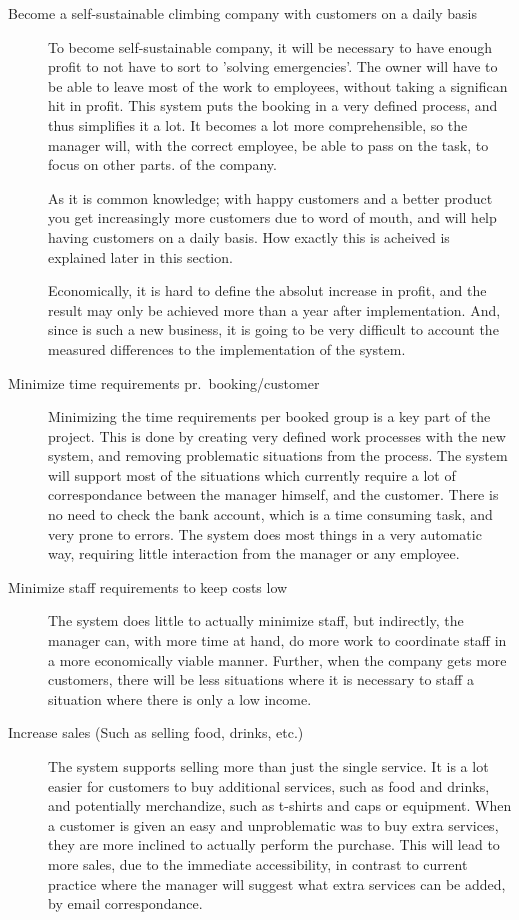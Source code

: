 \begin{description}
\item[Become a self-sustainable climbing company with customers on a daily basis]
To become self-sustainable company, it will be necessary to have enough profit
to not have to sort to 'solving emergencies'. The owner will have to be able 
to leave most of the work to employees, without taking a significan hit in 
profit. This system puts the booking in a very defined process, and thus 
simplifies it a lot. It becomes a lot more comprehensible, so the manager will,
with the correct employee, be able to pass on the task, to focus on other parts.
of the company.

As it is common knowledge; with happy customers and a better product
you get increasingly more customers due to word of mouth, and will help having 
customers on a daily basis. How exactly this is acheived is explained later in this 
section.

Economically, it is hard to define the absolut increase in profit, and the 
result may only be achieved more than a year after implementation. And, since 
\gomonkey{} is such a new business, it is going to be very difficult to account
the measured differences to the implementation of the system.

\item[Minimize time requirements pr.\ booking/customer]
Minimizing the time requirements per booked group is a key part of the project.
This is done by creating very defined work processes with the new system, and
removing problematic situations from the process. The system will support most
of the situations which currently require a lot of correspondance between the 
manager himself, and the customer. There is no need to check the bank account,
which is a time consuming task, and very prone to errors. The system does most
things in a very automatic way, requiring little interaction from the manager
or any employee.

\item[Minimize staff requirements to keep costs low]
The system does little to actually minimize staff, but indirectly, the manager
can, with more time at hand, do more work to coordinate staff in a more 
economically viable manner. Further, when the company gets more customers,
there will be less situations where it is necessary to staff a situation where
there is only a low income.

\item[Increase sales (Such as selling food, drinks, etc.)]
The system supports selling more than just the single service. It is a lot
easier for customers to buy additional services, such as food and drinks,
and potentially merchandize, such as t-shirts and caps or equipment. When a 
customer is given an easy and unproblematic was to buy extra services,
they are more inclined to actually perform the purchase. This will lead to
more sales, due to the immediate accessibility, in contrast to current practice
where the manager will suggest what extra services can be added, by email 
correspondance.


\end{description}
